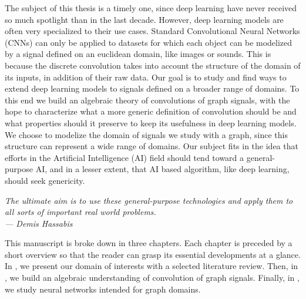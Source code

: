The subject of this thesis is a timely one, since deep learning have never received so much spotlight than in the last decade. However, deep learning models are often very specialized to their use cases. Standard Convolutional Neural Networks (CNNs) can only be applied to datasets for which each object can be modelized by a signal defined on an euclidean domain, like images or sounds. This is because the discrete convolution takes into account the structure of the domain of its inputs, in addition of their raw data. Our goal is to study and find ways to extend deep learning models to signals defined on a broader range of domains. To this end we build an algebraic theory of convolutions of graph signals, with the hope to characterize what a more generic definition of convolution should be and what properties should it preserve to keep its usefulness in deep learning models. We choose to modelize the domain of signals we study with a graph, since this structure can represent a wide range of domains. Our subject fits in the idea that efforts in the Artificial Intelligence (AI) field should tend toward a general-purpose AI, and in a lesser extent, that AI based algorithm, like deep learning, should seek genericity.

\begin{displayquote}
\begin{flushright}
\emph{The ultimate aim is to use these general-purpose technologies and apply them to all sorts of important real world problems.\\
--- Demis Hassabis}
\end{flushright}
\end{displayquote}

This manuscript is broke down in three chapters. Each chapter is preceded by a short overview so that the reader can grasp its essential developments at a glance. In , we present our domain of interests with a selected literature review. Then, in , we build an algebraic understanding of convolution of graph signals. Finally, in , we study neural networks intended for graph domains.


